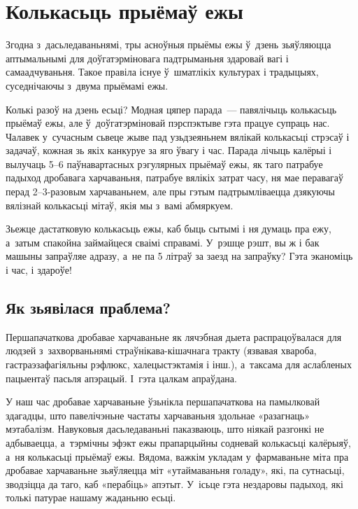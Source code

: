 \chapter{Колькасьць прыёмаў ежы}

Згодна з~дасьледаваньнямі, тры асноўныя прыёмы ежы ў~дзень зьяўляюцца аптымальнымі для доўгатэрміновага падтрыманьня здаровай вагі і самаадчуваньня. Такое правіла існуе ў~шматлікіх культурах і традыцыях, суседнічаючы з~двума прыёмамі ежы.

Колькі разоў на дзень есьці? Модная цяпер парада~--- павялічыць колькасьць прыёмаў ежы, але ў~доўгатэрміновай пэрспэктыве гэта працуе супраць нас. Чалавек у~сучасным сьвеце жыве пад узьдзеяньнем вялікай колькасьці стрэсаў і задачаў, кожная зь якіх канкуруе за яго ўвагу і час. Парада лічыць калёрыі і вылучаць 5--6 паўнавартасных рэгулярных прыёмаў ежы, як таго патрабуе падыход дробавага харчаваньня, патрабуе вялікіх затрат часу, ня мае перавагаў перад 2--3-разовым харчаваньнем, але пры гэтым падтрымліваецца дзякуючы вялізнай колькасьці мітаў, якія мы з~вамі абмяркуем.


Зьежце дастатковую колькасьць ежы, каб быць сытымі і ня думаць пра ежу, а~затым спакойна займайцеся сваімі справамі. У~рэшце рэшт, вы ж і бак машыны запраўляе адразу, а~не па 5 літраў за заезд на запраўку? Гэта эканоміць і час, і здароўе!

\section{Як зьявілася праблема?}

Першапачаткова дробавае харчаваньне як лячэбная дыета распрацоўвалася для людзей з~захворваньнямі страўнікава-кішачнага тракту (язвавая хвароба, гастраэзафагіяльны рэфлюкс, халецыстэктамія і інш.), а~таксама для аслабленых пацыентаў пасьля апэрацый. І~гэта цалкам апраўдана.

У наш час дробавае харчаваньне ўзьнікла першапачаткова на памылковай здагадцы, што павелічэньне частаты харчаваньня здольнае «разагнаць» мэтабалізм. Навуковыя дасьледаваньні паказваюць, што ніякай разгонкі не адбываецца, а~тэрмічны эфэкт ежы прапарцыйны содневай колькасьці калёрыяў, а~ня колькасьці прыёмаў ежы. Вядома, важкім укладам у~фармаваньне міта пра дробавае харчаваньне зьяўляецца міт «утаймаваньня голаду», які, па сутнасьці, зводзіцца да таго, каб «перабіць» апэтыт. У~ісьце гэта нездаровы падыход, які толькі патурае нашаму жаданьню есьці.

